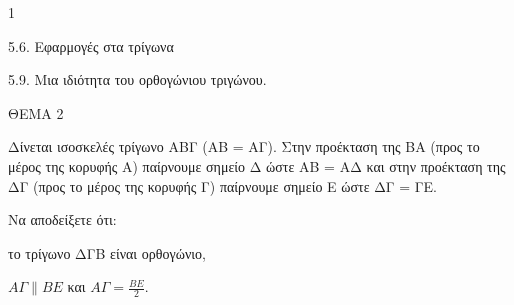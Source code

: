 \begin{ylh}{1}
    \item 5.6. Εφαρμογές στα τρίγωνα
    \item 5.9. Μια ιδιότητα του ορθογώνιου τριγώνου.
\end{ylh}

ΘΕΜΑ 2

Δίνεται ισοσκελές τρίγωνο ΑΒΓ (ΑΒ = ΑΓ). Στην προέκταση της ΒΑ (προς το μέρος της κορυφής Α) παίρνουμε σημείο Δ ώστε ΑΒ = ΑΔ και στην προέκταση της ΔΓ (προς το μέρος της κορυφής Γ) παίρνουμε σημείο Ε ώστε ΔΓ = ΓΕ.

Να αποδείξετε ότι:

\begin{alist}
\item το τρίγωνο ΔΓΒ είναι ορθογώνιο, 

\item $A\Gamma \parallel BE$ και $A\Gamma = \frac{BE}{2}$. 

\begin{center}
\end{center}


\end{alist}
